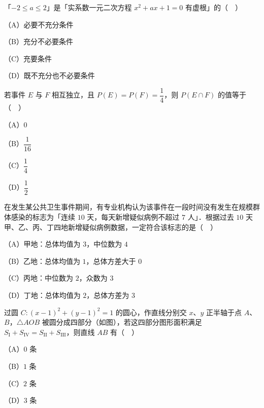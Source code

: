 \begin{question}
「$-2\leqslant a\leqslant2$」是「实系数一元二次方程 $x^2+ax+1=0$ 有虚根」的（　）

（A）必要不充分条件

（B）充分不必要条件

（C）充要条件

（D）既不充分也不必要条件

\end{question}
\begin{question}
若事件 $E$ 与 $F$ 相互独立，且 $P(E)=P(F)=\dfrac14$，则 $P(E\cap F)$ 的值等于（　）

（A）$0$

（B）$\dfrac1{16}$

（C）$\dfrac14$

（D）$\dfrac12$

\end{question}
\begin{question}
在发生某公共卫生事件期间，有专业机构认为该事件在一段时间没有发生在规模群体感染的标志为「连续 $10$ 天，每天新增疑似病例不超过 $7$ 人」．根据过去 $10$ 天甲、乙、丙、丁四地新增疑似病例数据，一定符合该标志的是（　）

（A）甲地：总体均值为 $3$，中位数为 $4$

（B）乙地：总体均值为 $1$，总体方差大于 $0$

（C）丙地：中位数为 $2$，众数为 $3$

（D）丁地：总体均值为 $2$，总体方差为 $3$

\Needspace{0.4\textheight}
\end{question}
\begin{question}
过圆 $C:(x-1)^2+(y-1)^2=1$ 的圆心，作直线分别交 $x$、$y$ 正半轴于点 $A$、$B$，$\triangle AOB$ 被圆分成四部分（如图），若这四部分图形面积满足 $S_{\mathrm I}+S_{\mathrm{IV}}=S_{\mathrm{II}}+S_{\mathrm{III}}$，则直线 $AB$ 有（　）
\nopagebreak[4]
\begin{center}\end{center}
\nopagebreak[4]
（A）$0$ 条

（B）$1$ 条

（C）$2$ 条

（D）$3$ 条

\end{question}

